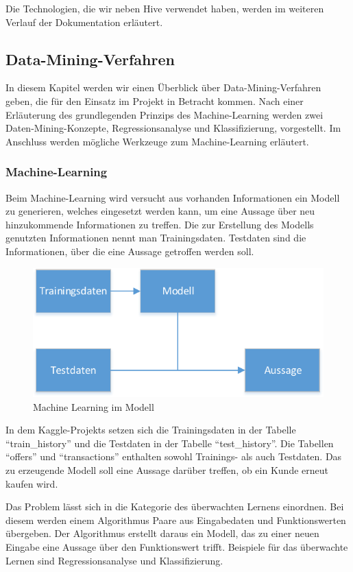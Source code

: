 Die Technologien, die wir neben Hive verwendet haben, werden im weiteren Verlauf der Dokumentation erläutert.


\subsection{Data-Mining-Verfahren}
In diesem Kapitel werden wir einen Überblick über Data-Mining-Verfahren geben, die für den Einsatz im Projekt in Betracht kommen. Nach einer Erläuterung des grundlegenden Prinzips des Machine-Learning werden zwei Daten-Mining-Konzepte, Regressionsanalyse und Klassifizierung, vorgestellt. Im Anschluss werden mögliche Werkzeuge zum Machine-Learning erläutert.

\subsubsection{Machine-Learning}
\label{subsubSec:MachineLearning}
Beim Machine-Learning wird versucht aus vorhanden Informationen ein Modell zu generieren, welches eingesetzt werden kann, um eine Aussage über neu hinzukommende Informationen zu treffen. Die zur Erstellung des Modells genutzten Informationen nennt man Trainingsdaten. Testdaten sind die Informationen, über die eine Aussage getroffen werden soll.

\begin{figure}[H]
\centering
\includegraphics[width=0.7\linewidth]{Bilder/DataMining}
\caption{Machine Learning im Modell}
\label{fig:MachineLearning}
\end{figure}

In dem Kaggle-Projekts setzen sich die Trainingsdaten in der Tabelle "`train\_history"' und die Testdaten in der Tabelle "`test\_history"'. Die Tabellen "`offers"' und "`transactions"' enthalten sowohl Trainings- als auch Testdaten. Das zu erzeugende Modell soll eine Aussage darüber treffen, ob ein Kunde erneut kaufen wird.

Das Problem lässt sich in die Kategorie des überwachten Lernens einordnen. Bei diesem werden 
einem Algorithmus Paare aus Eingabedaten und Funktionswerten übergeben. Der Algorithmus erstellt
daraus ein Modell, das zu einer neuen Eingabe eine Aussage über den Funktionswert trifft. Beispiele für
das überwachte Lernen sind Regressionsanalyse und Klassifizierung.
 
